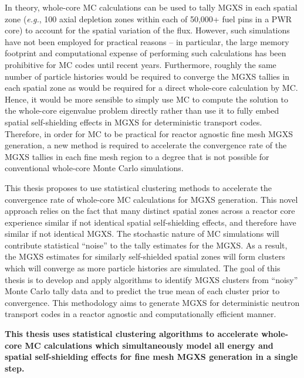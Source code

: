 In theory, whole-core \ac{MC} calculations can be used to tally \ac{MGXS} in each spatial zone (\textit{e.g.}, 100 axial depletion zones within each of 50,000+ fuel pins in a \ac{PWR} core) to account for the spatial variation of the flux. However, such simulations have not been employed for practical reasons -- in particular, the large memory footprint and computational expense of performing such calculations has been prohibitive for \ac{MC} codes until recent years. Furthermore, roughly the same number of particle histories would be required to converge the \ac{MGXS} tallies in each spatial zone as would be required for a direct whole-core calculation by \ac{MC}. Hence, it would be more sensible to simply use \ac{MC} to compute the solution to the whole-core eigenvalue problem directly rather than use it to fully embed spatial self-shielding effects in \ac{MGXS} for deterministic transport codes. Therefore, in order for \ac{MC} to be practical for reactor agnostic fine mesh \ac{MGXS} generation, a new method is required to accelerate the convergence rate of the \ac{MGXS} tallies in each fine mesh region to a degree that is not possible for conventional whole-core Monte Carlo simulations. 

This thesis proposes to use statistical clustering methods to accelerate the convergence rate of whole-core \ac{MC} calculations for \ac{MGXS} generation. This novel approach relies on the fact that many distinct spatial zones across a reactor core experience similar if not identical spatial self-shielding effects, and therefore have similar if not identical \ac{MGXS}. The stochastic nature of \ac{MC} simulations will contribute statistical ``noise'' to the tally estimates for the \ac{MGXS}. As a result, the \ac{MGXS} estimates for similarly self-shielded spatial zones will form clusters which will converge as more particle histories are simulated. The goal of this thesis is to develop and apply algorithms to identify \ac{MGXS} clusters from ``noisy'' Monte Carlo tally data and to predict the true mean of each cluster prior to convergence. This methodology aims to generate \ac{MGXS} for deterministic neutron transport codes in a reactor agnostic and computationally efficient manner.


\begin{emphbox}
\textbf{This thesis uses statistical clustering algorithms to accelerate whole-core \ac{MC} calculations
which simultaneously model all energy and spatial self-shielding effects for fine mesh \ac{MGXS} generation in a single step.}
\end{emphbox}


